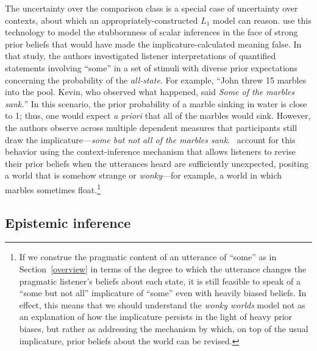 \documentclass{sp}
\begin{document}
The uncertainty over the comparison class is a special case of uncertainty over contexts, about which an appropriately-constructed $L_1$ model can reason. \cite{degen2015wonky} use this technology to model the stubbornness of scalar inferences in the face of strong prior beliefs that would have made the implicature-calculated meaning false. In that study, the authors investigated listener interpretations of quantified statements involving ``some'' in a set of stimuli with diverse prior expectations concerning the probability of the \emph{all-state}. For example, ``John threw 15 marbles into the pool. Kevin, who observed what happened, said \emph{Some of the marbles sank.}'' In this scenario, the prior probability of a marble sinking in water is close to 1; thus, one would expect \emph{a priori} that all of the marbles would sink. However, the authors observe across multiple dependent measures that participants still draw the implicature---\emph{some but not all of the marbles sank}. \citeauthor{degen2015wonky}~account for this behavior using the context-inference mechanism that allows listeners to revise their prior beliefs when the utterances heard are sufficiently unexpected, positing a world that is somehow strange or \emph{wonky}---for example, a world in which marbles sometimes float.\footnote{
 If we construe the pragmatic content of an utterance of ``some'' as in Section~\ref{overview} in terms of the degree to which the utterance changes the pragmatic listener's beliefs about each state, it is still feasible to speak of a ``some but not all'' implicature of ``some'' even with heavily biased beliefs. In effect, this means that we should understand the \emph{wonky worlds} model not as an explanation of how the implicature persists in the light of heavy prior biases, but rather as addressing the mechanism by which, on top of the usual implicature, prior beliefs about the world can be revised.
}


\subsection{Epistemic inference}
\label{sec:epistemic-inference}
\end{document}

